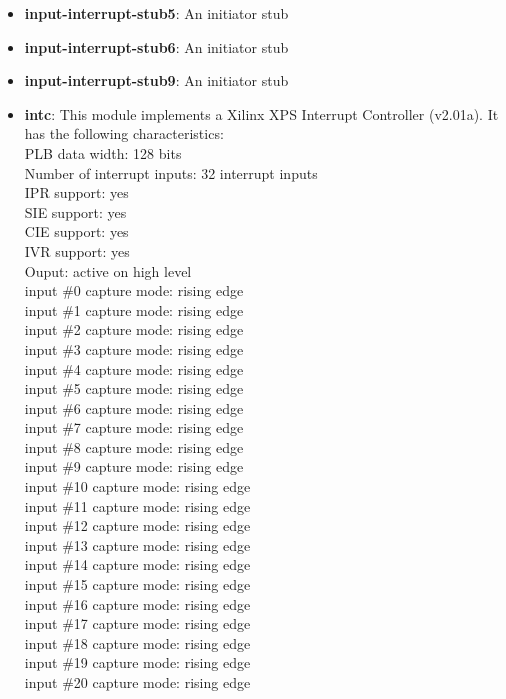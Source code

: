 \begin{itemize}
\item \textbf{input-interrupt-stub5}: An initiator stub
\item \textbf{input-interrupt-stub6}: An initiator stub
\item \textbf{input-interrupt-stub9}: An initiator stub
\item \textbf{intc}: This module implements a Xilinx XPS Interrupt Controller (v2.01a). It has the following characteristics:\\
PLB data width: 128 bits\\
Number of interrupt inputs: 32 interrupt inputs\\
IPR support: yes\\
SIE support: yes\\
CIE support: yes\\
IVR support: yes\\
Ouput: active on high level\\
input \#0 capture mode: rising edge\\
input \#1 capture mode: rising edge\\
input \#2 capture mode: rising edge\\
input \#3 capture mode: rising edge\\
input \#4 capture mode: rising edge\\
input \#5 capture mode: rising edge\\
input \#6 capture mode: rising edge\\
input \#7 capture mode: rising edge\\
input \#8 capture mode: rising edge\\
input \#9 capture mode: rising edge\\
input \#10 capture mode: rising edge\\
input \#11 capture mode: rising edge\\
input \#12 capture mode: rising edge\\
input \#13 capture mode: rising edge\\
input \#14 capture mode: rising edge\\
input \#15 capture mode: rising edge\\
input \#16 capture mode: rising edge\\
input \#17 capture mode: rising edge\\
input \#18 capture mode: rising edge\\
input \#19 capture mode: rising edge\\
input \#20 capture mode: rising edge\\

\end{itemize}

